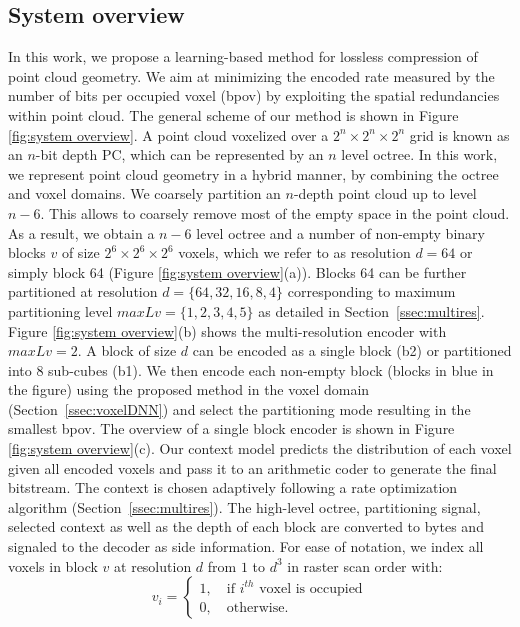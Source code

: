 \subsection{System overview}
\label{problem fomulation}
In this work, we propose a learning-based method for lossless compression of point cloud geometry. We aim at minimizing the encoded rate measured by the number of bits per occupied voxel (bpov) by exploiting the spatial redundancies within point cloud. The general scheme of our method is shown in Figure \ref{fig:system overview}. A point cloud voxelized over a $2^n \times 2^n \times 2^n$ grid is known as an $n$-bit depth PC, which can be represented by an $n$ level octree. In this work, we represent point cloud geometry in a hybrid manner, by combining  the octree and voxel domains. We coarsely partition an $n$-depth point cloud up to  level $n-6$. This allows to coarsely remove most of the empty space in the point cloud. As a result, we obtain a $n-6$ level octree and a number of non-empty binary blocks $v$ of size $2^6 \times 2^6 \times 2^6$ voxels, which we refer to as resolution $d=64$ or simply block 64 (Figure \ref{fig:system overview}(a)). Blocks 64 can be further partitioned at resolution $d=\{64,32, 16, 8, 4\}$ corresponding to maximum partitioning level $maxLv=\{1,2,3,4,5\}$ as detailed in Section~\ref{ssec:multires}. Figure \ref{fig:system overview}(b) shows the multi-resolution encoder with $maxLv=2$.  A block of size $d$ can be encoded as a single block (b2) or partitioned into 8 sub-cubes (b1). We then encode each non-empty block (blocks in blue in the figure) using the proposed method in the voxel domain (Section~\ref{ssec:voxelDNN}) and select the  partitioning mode resulting in the smallest bpov. The overview of a single block encoder is shown in Figure \ref{fig:system overview}(c). Our context model predicts the distribution of each voxel given all encoded voxels and pass it to an arithmetic coder to generate the final bitstream. The context is chosen adaptively following a rate optimization algorithm (Section~\ref{ssec:multires}). The high-level octree, partitioning signal, selected context as well as the depth of each block are converted to bytes and signaled to the decoder as side information. For ease of notation, we index all voxels in block $v$ at resolution $d$ from $1$ to ${d^3}$ in raster scan order with:
 \begin{equation}
    v_i= 
    \begin{cases} 
    1, \quad \text{if $i^{th}$ voxel is occupied}\\
    0, \quad \text{otherwise}.
    \end{cases}
\label{focalloss}
\end{equation}


